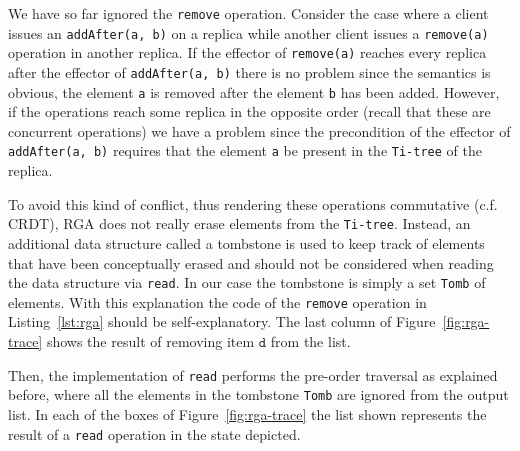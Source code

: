 
We have so far ignored the \lstinline|remove| operation.
%
Consider the case where a client issues an \lstinline|addAfter(a, b)|
on a replica while another client issues a \lstinline|remove(a)|
operation in another replica.
%
If the effector of \lstinline|remove(a)| reaches every replica after
the effector of \lstinline|addAfter(a, b)| there is no problem since
the semantics is obvious, the element \lstinline|a| is removed after
the element \lstinline|b| has been added.
%
However, if the operations reach some replica in the opposite order
(recall that these are concurrent operations) we have a problem since
the precondition of the effector of \lstinline|addAfter(a, b)|
requires that the element \lstinline|a| be present in the
\lstinline|Ti-tree| of the replica.

To avoid this kind of conflict, thus rendering these operations
commutative (c.f. CRDT), RGA does not really erase elements from the
\lstinline|Ti-tree|.
%
Instead, an additional data structure called a tombstone is used to
keep track of elements that have been conceptually erased and should
not be considered when reading the data structure via \lstinline|read|.
%
In our case the tombstone is simply a set \lstinline|Tomb| of
elements.
%
With this explanation the code of the \lstinline|remove| operation
in Listing~\ref{lst:rga} should be self-explanatory.
%
The last column of Figure~\ref{fig:rga-trace} shows the result of
removing item $\mathtt{d}$ from the list.

Then, the implementation of \lstinline|read| performs the pre-order
traversal as explained before, where all the elements in the tombstone
\lstinline|Tomb| are ignored from the output list.
%
In each of the boxes of Figure~\ref{fig:rga-trace} the list shown
represents the result of a \lstinline|read| operation in the state
depicted.



